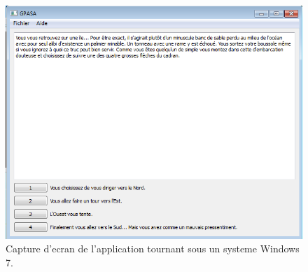 \begin{figure}[p]
\centering
\includegraphics[scale=0.65]{figures/screenshots/windows7}
\caption{Capture d'ecran de l'application tournant sous un systeme Windows 7.}
\label{CaptureWindows7}
\end{figure}



